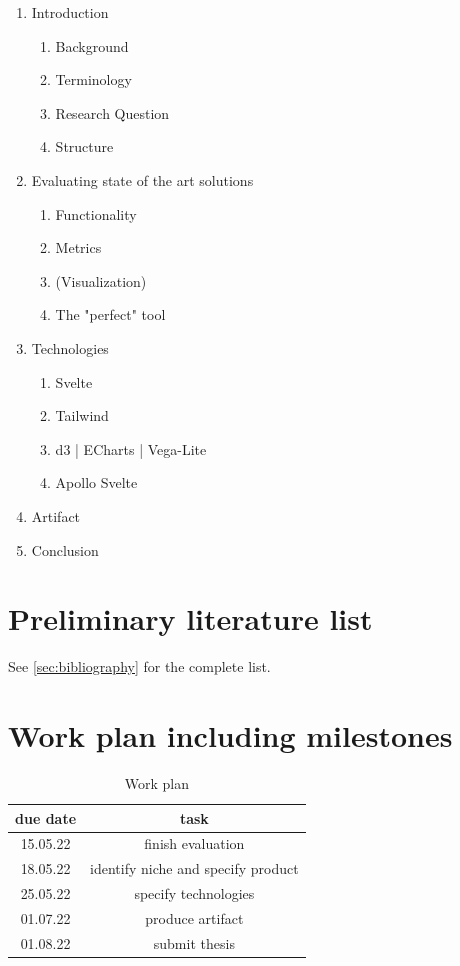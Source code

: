 \documentclass[authoryear,preprint,review,12pt]{elsarticle}
\begin{document}
\begin{enumerate}
  \item Introduction
        \begin{enumerate}
          \item Background
          \item Terminology
          \item Research Question
          \item Structure
        \end{enumerate}
  \item Evaluating state of the art solutions
        \begin{enumerate}
          \item Functionality
          \item Metrics
          \item (Visualization)
          \item The "perfect" tool
        \end{enumerate}
  \item Technologies
        \begin{enumerate}
          \item Svelte
          \item Tailwind
          \item d3 | ECharts | Vega-Lite
          \item Apollo Svelte
        \end{enumerate}
  \item Artifact
  \item Conclusion
\end{enumerate}

\section{Preliminary literature list}
\label{sec:literature}

See \ref{sec:bibliography} for the complete list.

\section{Work plan including milestones}
\label{sec:workplan}
\begin{table}[h]
  \centering\begin{tabular}{ |c | c| }
    \hline
    due date & task                               \\
    \hline
    15.05.22 & finish evaluation                  \\
    \hline
    18.05.22 & identify niche and specify product \\
    \hline
    25.05.22 & specify technologies               \\
    \hline
    01.07.22 & produce artifact                   \\
    \hline
    01.08.22 & submit thesis                      \\
    \hline
  \end{tabular}
  \caption{Work plan}
  \label{fig:workplan}
\end{table}
\listoffigures
\listoftables

\nocite{*}


\label{sec:bibliography}
\end{document}
